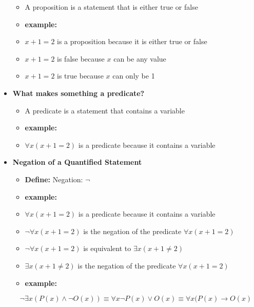 \documentclass{article}
\begin{document}
\begin{itemize}
\begin{itemize}
                \item[] A proposition is a statement that is either true or false
                \item[] \textbf{example:}
                \item[] $x + 1 = 2$ is a proposition because it is either true or false
                \item[] $x + 1 = 2$ is false because $x$ can be any value
                \item[] $x + 1 = 2$ is true because $x$ can only be 1
            \end{itemize}
        \item[] \textbf{What makes something a predicate?}
            \begin{itemize}
                \item[] A predicate is a statement that contains a variable
                \item[] \textbf{example:}
                \item[] $\forall x(x + 1 = 2)$ is a predicate because it contains a variable
            \end{itemize}
        \item[] \textbf{Negation of a Quantified Statement}
            \begin{itemize}
                \item[] \textbf{Define:} Negation: $\lnot$

            \end{itemize}
            \begin{itemize}
                \item[] \textbf{example:}
                \item[] $\forall x(x + 1 = 2)$ is a predicate because it contains a variable
                \item[] $\lnot \forall x(x + 1 = 2)$ is the negation of the predicate $\forall x(x + 1 = 2)$
                \item[] $\lnot \forall x(x + 1 = 2)$ is equivalent to $\exists x(x + 1 \neq 2)$
                \item[] $\exists x(x + 1 \neq 2)$ is the negation of the predicate $\forall x(x + 1 = 2)$
            \end{itemize}
            \begin{itemize}
                \item[] \textbf{example:}
            \end{itemize}
            \begin{equation}
                \lnot \exists x(P(x) \land \lnot O(x)) \equiv 
                 \forall x \lnot P(x) \lor O(x) \equiv 
                  \forall x(P(x) \rightarrow O(x)
            \end{equation}
    \end{itemize}
\end{document}
